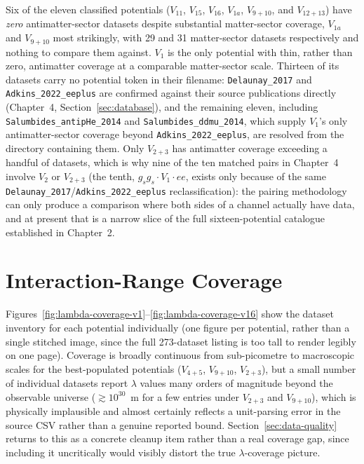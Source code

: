 \documentclass[main]{subfiles}
\begin{document}
Six of the eleven classified potentials ($V_{11}$, $V_{15}$, $V_{16}$,
$V_{1a}$, $V_{9+10}$, and $V_{12+13}$) have \emph{zero} antimatter-sector
datasets despite substantial matter-sector coverage, $V_{1a}$ and $V_{9+10}$
most strikingly, with 29 and 31 matter-sector datasets respectively and
nothing to compare them against. $V_1$ is the only potential with thin,
rather than zero, antimatter coverage at a comparable matter-sector scale.
Thirteen of its datasets carry no potential token in their filename:
\texttt{Delaunay\_2017} and \texttt{Adkins\_2022\_eeplus} are confirmed
against their source publications directly (Chapter~4,
Section~\ref{sec:database}), and the remaining eleven, including
\texttt{Salumbides\_antipHe\_2014} and \texttt{Salumbides\_ddmu\_2014},
which supply $V_1$'s only antimatter-sector coverage beyond
\texttt{Adkins\_2022\_eeplus}, are resolved from the directory containing
them. Only $V_{2+3}$ has
antimatter coverage exceeding a handful of datasets, which is why nine of
the ten matched pairs in Chapter~4 involve $V_2$ or $V_{2+3}$ (the tenth,
$g_sg_s\cdot V_1\cdot ee$, exists only because of the same
\texttt{Delaunay\_2017}/\texttt{Adkins\_2022\_eeplus} reclassification):
the pairing methodology can only produce a comparison where both sides of
a channel actually have data, and at present that is a narrow slice of the
full sixteen-potential catalogue established in Chapter~2.

\section{Interaction-Range Coverage}

Figures~\ref{fig:lambda-coverage-v1}--\ref{fig:lambda-coverage-v16} show the
dataset inventory for each potential individually (one figure per
potential, rather than a single stitched image, since the full 273-dataset
listing is too tall to render legibly on one page). Coverage is broadly
continuous from sub-picometre to macroscopic scales for the best-populated
potentials ($V_{4+5}$, $V_{9+10}$, $V_{2+3}$), but a small number of
individual datasets report $\lambda$ values many orders of magnitude beyond
the observable universe ($\gtrsim10^{30}$~m for a few entries under
$V_{2+3}$ and $V_{9+10}$), which is physically implausible and almost
certainly reflects a unit-parsing error in the source CSV rather than a
genuine reported bound. Section~\ref{sec:data-quality} returns to this as a
concrete cleanup item rather than a real coverage gap, since including it
uncritically would visibly distort the true $\lambda$-coverage picture.
\end{document}
